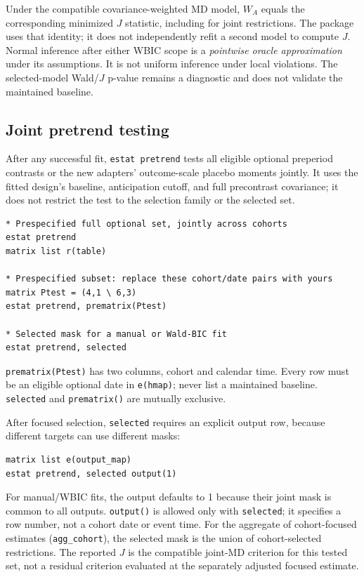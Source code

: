 \documentclass[11pt]{article}
\newcommand{\cmd}[1]{\texttt{#1}}
\begin{document}
Under the compatible covariance-weighted MD model, $W_A$ equals the
corresponding minimized $J$ statistic, including for joint restrictions.
The package uses that identity; it does not independently refit a second
model to compute $J$. Normal inference after either WBIC scope is a
\emph{pointwise oracle approximation} under its assumptions. It is not
uniform inference under local violations. The selected-model Wald/$J$
p-value remains a diagnostic and does not validate the maintained baseline.

\subsection{Joint pretrend testing}
\label{sec:pretrend}
After any successful fit, \cmd{estat pretrend} tests all eligible optional
preperiod contrasts or the new adapters' outcome-scale placebo moments
jointly. It uses the fitted design's
baseline, anticipation cutoff, and full precontrast covariance; it does not
restrict the test to the selection family or the selected set.
\begin{lstlisting}
* Prespecified full optional set, jointly across cohorts
estat pretrend
matrix list r(table)

* Prespecified subset: replace these cohort/date pairs with yours
matrix Ptest = (4,1 \ 6,3)
estat pretrend, prematrix(Ptest)

* Selected mask for a manual or Wald-BIC fit
estat pretrend, selected
\end{lstlisting}
\cmd{prematrix(Ptest)} has two columns, cohort and calendar time. Every row
must be an eligible optional date in \cmd{e(hmap)}; never list a maintained
baseline. \cmd{selected} and \cmd{prematrix()} are mutually exclusive.

After focused selection, \cmd{selected} requires an explicit output row,
because different targets can use different masks:
\begin{lstlisting}
matrix list e(output_map)
estat pretrend, selected output(1)
\end{lstlisting}
For manual/WBIC fits, the output defaults to 1 because their joint mask is
common to all outputs. \cmd{output()} is allowed only with \cmd{selected};
it specifies a row number, not a cohort date or event time.
For the aggregate of cohort-focused estimates (\cmd{agg\_cohort}), the
selected mask is the union of cohort-selected restrictions. The reported $J$
is the compatible joint-MD criterion for this tested set, not a residual
criterion evaluated at the separately adjusted focused estimate.
\end{document}
